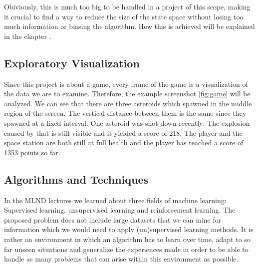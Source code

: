 \documentclass[a4paper,10pt]{article}
\begin{document}
Obiviously, this is much too big to be handled in a project of this scope, making it crucial to find a way to reduce the size of the state space without losing too much information or biasing the algorithm.
How this is achieved will be explained in the chapter .


\subsection{Exploratory Visualization}

Since this project is about a game, every frame of the game is a visualization of the data we are to examine.
Therefore, the example screenshot \ref{fig:game} will be analyzed.
We can see that there are three asteroids which spawned in the middle region of the screen.
The vertical distance between them is the same since they spawned at a fixed interval.
One asteroid was shot down recently: The explosion caused by that is still visible and it yielded a score of 218.
The player and the space station are both still at full health and the player has reached a score of 1353 points so far.
\subsection{Algorithms and Techniques}
\label{algorithms}

In the MLND lectures we learned about three fields of machine learning: Supervised learning, unsupervised learning and reinforcement learning.
The proposed problem does not include large datasets that we can mine for information which we would need to apply (un)supervised learning methods. 
It is rather an environment in which an algorithm has to learn over time, adapt to so far unseen  situations and generalize the experiences made in order to be able to handle as many problems that can arise within this environment as possible.
\end{document}
